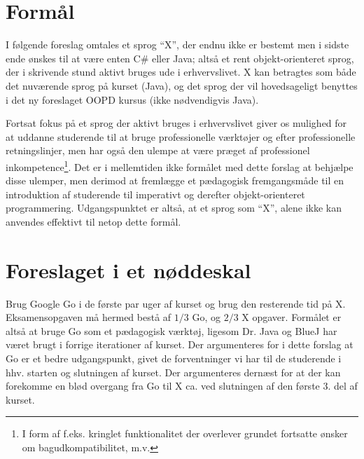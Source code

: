 \section{Formål}

I følgende foreslag omtales et sprog ``X'', der endnu ikke er bestemt men i
sidste ende ønskes til at være enten C\# eller Java; altså et rent
objekt-orienteret sprog, der i skrivende stund aktivt bruges ude i
erhvervslivet. X kan betragtes som både det nuværende sprog på kurset (Java),
og det sprog der vil hovedsageligt benyttes i det ny foreslaget OOPD kursus
(ikke nødvendigvis Java).

Fortsat fokus på et sprog der aktivt bruges i erhvervslivet giver os mulighed
for at uddanne studerende til at bruge professionelle værktøjer og efter
professionelle retningslinjer, men har også den ulempe at være præget af
professionel inkompetence\footnote{I form af f.eks. kringlet funktionalitet der
overlever grundet fortsatte ønsker om bagudkompatibilitet, m.v.}. Det er i
mellemtiden ikke formålet med dette forslag at behjælpe disse ulemper, men
derimod at fremlægge et pædagogisk fremgangsmåde til en introduktion af
studerende til imperativt og derefter objekt-orienteret programmering.
Udgangspunktet er altså, at et sprog som ``X'', alene ikke kan anvendes
effektivt til netop dette formål.

\section{Foreslaget i et nøddeskal}

Brug Google Go i de første par uger af kurset og brug den resterende tid på X.
Eksamensopgaven må hermed bestå af $1/3$ Go, og $2/3$ X opgaver. Formålet er
altså at bruge Go som et pædagogisk værktøj, ligesom Dr. Java\cite{dr-java} og
BlueJ\cite{bluej} har været brugt i forrige iterationer af kurset. Der
argumenteres for i dette forslag at Go er et bedre udgangspunkt, givet de
forventninger vi har til de studerende i hhv. starten og slutningen af kurset.
Der argumenteres dernæst for at der kan forekomme en blød overgang fra Go til X
ca. ved slutningen af den første 3. del af kurset.



